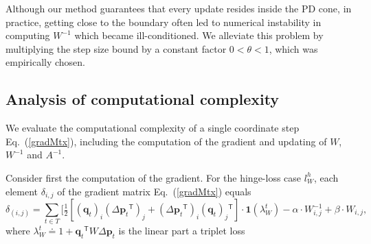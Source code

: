 \documentclass{article} %
\newcommand\mat[1]{{#1}}
\renewcommand\vec[1]{\mathbf{#1}}
\newcommand{\T}{{}^\mathsf{T}}
\newcommand{\W}{\mat{W}}
\newcommand{\eqdef}{\doteq}
\newcommand{\ignore}[1]{}
\newcommand{\q}{{\vec{q}}}
\newcommand{\p}{{\vec{p}}}
\newcommand{\trip}{{t}}
\newcommand{\qt}{{\q_{\trip}}}
\newcommand{\invA}{A^{-1}}
\renewcommand{\eqref}[1]{Eq.~(\ref{#1})}
\begin{document}
\ignore{
Although the step size bound guarantees that every update resides inside the PD cone, in practice, getting close to the boundary often led to numerical instability in computing $\W^{-1}$ which became ill-conditioned. Having the $\log \det$ regularizer in the objective greatly improved the numerical stability.}

Although our method guarantees that every update resides inside the PD cone, in practice, getting close to the boundary often led to numerical instability in computing $\W^{-1}$ which became ill-conditioned. We alleviate this problem by multiplying the step size bound by a constant factor $0< \theta <1$, which was empirically chosen.

\ignore{
\subsection{Numerical Stability}
The step size upper bound keeps the search always inside th e PD cone. This is sufficient for the theoretical optimization process. However, from a practical point of view, since COMET evaluates $\W^{-1}$ on every step, it should not update $\W$ with a solution that is near the PD cone edge, otherwise it will be difficult to evaluate $\W^{-1}$, and will undermine the numerical stability of our approach. 

To guarantee the numerical stability we took two measures: (a) We introduced the $\log \det$ barrier regularization \eqref{eq-logdet-loss}. (b) We multiplied the step size bound by a coefficient $\theta, 0 < \theta < 1$ which was chosen empirically once. 
}

\subsection{Analysis of computational complexity}
We evaluate the computational complexity of a single coordinate step \eqref{gradMtx}, including the computation of the gradient and updating of $\W$, $\W^{-1}$ and $\invA$.

Consider first the computation of the gradient. For the hinge-loss case $l^{h}_W$, each element $\delta_{i,j}$ of the gradient matrix \eqref{gradMtx} equals
\begin{equation}
    \delta_{(i,j)} = \sum\limits_{t\in T}{ [\tfrac{1}{2}[(\vec{q}_{t})_i(\Delta\vec{p}_{t}\T)_j + (\Delta\vec{p}_{t}\T)_i(\vec{q}_{t})_j\T] } \cdot \textbf{1}(\lambda_{W}^t) - \alpha \cdot \W^{-1}_{i,j} + \beta \cdot \W_{i,j},
\label{gradMatElem}
\end{equation}
where $\lambda_{W}^t \eqdef 1+\qt\T \W \Delta\p_{t}$ is the linear part a triplet loss
\end{document}

